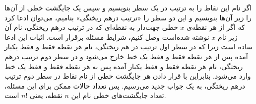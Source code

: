 \p
	اگر نام این نقاط را به ترتیب در یک سطر بنویسیم و سپس
	یک جایگشت خطی از آن‌ها را زیر آن‌ها بنویسیم و این دو سطر را «ترتیب درهم ریختگی» بنامیم، می‌توان
	ادعا کرد که اگر از هر نقطه‌ی
	$x$
	خطی جهت‌دار به نقطه‌ای که در ترتیب درهم ریختگی، نام آن
	زیر نام
	$x$
	نوشته شده‌است وصل کنیم، شرایط مسئله برقرار است.
	اثبات این ادعا ساده است زیرا که در سطر اول ترتیب در هم ریختگی،
	نام هر نقطه فقط و فقط یکبار آمده پس از هر نقطه فقط و فقط یک خط خارج می‌شود
	و در سطر دوم ترتیب درهم ریختگی، نام هر نقطه فقط و فقط یکبار آمده پس
	به هر نقطه فقط و فقط یک خط وارد می‌شود. بنابراین با قرار دادن هر جایگشت خطی
	از نام نقاط در سطر دوم ترتیب درهم ریختگی، به یک جواب جدید می‌رسیم.
	پس تعداد حالات ممکن برای این مسئله، تعداد جایگشت‌های خطی نام این
	$n$
	نقطه، یعنی 
	$n!$
	است.
